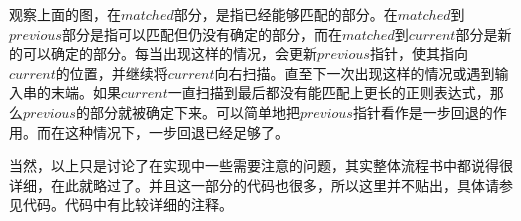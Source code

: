 观察上面的图，在$matched$部分，是指已经能够匹配的部分。在$matched$到$previous$部分是指可以匹配但仍没有确定的部分，而在$matched$到$current$部分是新的可以确定的部分。每当出现这样的情况，会更新$previous$指针，使其指向$current$的位置，并继续将$current$向右扫描。直至下一次出现这样的情况或遇到输入串的末端。如果$current$一直扫描到最后都没有能匹配上更长的正则表达式，那么$previous$的部分就被确定下来。可以简单地把$previous$指针看作是一步回退的作用。而在这种情况下，一步回退已经足够了。

当然，以上只是讨论了在实现中一些需要注意的问题，其实整体流程书中都说得很详细，在此就略过了。并且这一部分的代码也很多，所以这里并不贴出，具体请参见代码。代码中有比较详细的注释。
